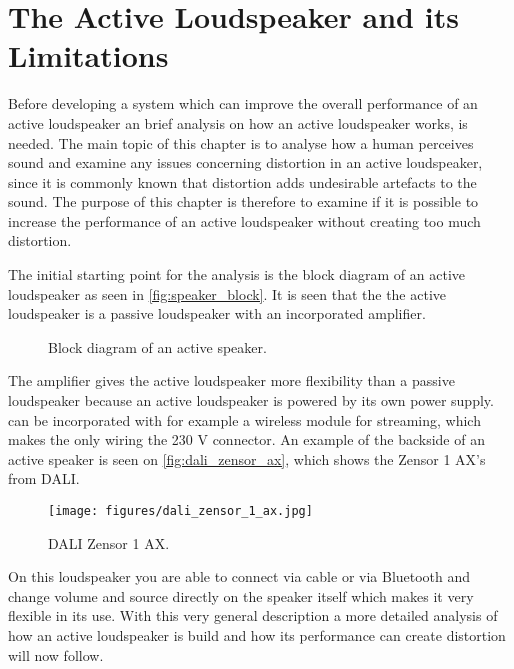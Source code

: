 


\chapter{The Active Loudspeaker and its Limitations}
Before developing a system which can improve the overall performance of an active loudspeaker an brief analysis on how an active loudspeaker works, is needed. The main topic of this chapter is to analyse how a human perceives sound and examine any issues concerning distortion in an active loudspeaker, since it is commonly known that distortion adds undesirable artefacts to the sound. The purpose of this chapter is therefore to examine if it is possible to increase the performance of an active loudspeaker without creating too much distortion. 

The initial starting point for the analysis is the block diagram of an active loudspeaker as seen in \autoref{fig:speaker_block}. It is seen that the the active loudspeaker is a passive loudspeaker with an incorporated amplifier.

\begin{figure}[H]
\centering
{}
\scalebox{0.9}{
}
\caption{Block diagram of an active speaker.}
\label{fig:speaker_block}
\end{figure}
The amplifier gives the active loudspeaker more flexibility than a passive loudspeaker because an active loudspeaker is powered by its own power supply. can be incorporated with for example a wireless module for streaming, which makes the only wiring the 230 V connector. An example of the backside of an active speaker is seen on \autoref{fig:dali_zensor_ax}, which shows the Zensor 1 AX's from DALI.
\begin{figure}[H]
\centering
\texttt{[image: figures/dali\_zensor\_1\_ax.jpg]}
\caption{DALI Zensor 1 AX.}
\label{fig:dali_zensor_ax}
\end{figure}
On this loudspeaker you are able to connect via cable or via Bluetooth and change volume and source directly on the speaker itself which makes it very flexible in its use. With this very general description a more detailed analysis of how an active loudspeaker is build and how its performance can create distortion will now follow. 



